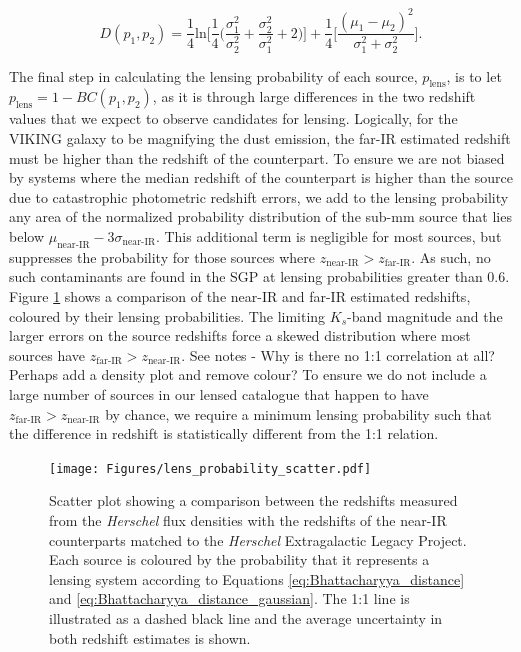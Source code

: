 \begin{equation}
    D(p_1, p_2) = \frac{1}{4}\textrm{ln}\Bigg[\frac{1}{4}\Bigg(\frac{\sigma_1^2}{\sigma_2^2}+\frac{\sigma_2^2}{\sigma_1^2}+2\Bigg)\Bigg] + \frac{1}{4}\Bigg[\frac{(\mu_1 - \mu_2)^2}{\sigma_1^2 + \sigma_2^2}\Bigg].
\label{eq:Bhattacharyya_distance_gaussian}
\end{equation}

The final step in calculating the lensing probability of each source, $p_{\textrm{lens}}$, is to let $p_{\textrm{lens}} = 1 - BC(p_1, p_2)$, as it is through large differences in the two redshift values that we expect to observe candidates for lensing. Logically, for the VIKING galaxy to be magnifying the dust emission, the far-IR estimated redshift must be higher than the redshift of the counterpart. To ensure we are not biased by systems where the median redshift of the counterpart is higher than the source due to catastrophic photometric redshift errors, we add to the lensing probability any area of the normalized probability distribution of the sub-mm source that lies below $\mu_\textrm{near-IR} - 3\sigma_\textrm{near-IR}$. This additional term is negligible for most sources, but suppresses the probability for those sources where $z_\textrm{near-IR} > z_\textrm{far-IR}$. As such, no such contaminants are found in the SGP at lensing probabilities greater than $0.6$. Figure \ref{fig:lens_probability_scatter} shows a comparison of the near-IR and far-IR estimated redshifts, coloured by their lensing probabilities. The limiting $K_s$-band magnitude and the larger errors on the source redshifts force a skewed distribution where most sources have $z_\textrm{far-IR} > z_\textrm{near-IR}$. {\color{red}See notes - Why is there no 1:1 correlation at all? Perhaps add a density plot and remove colour?} To ensure we do not include a large number of sources in our lensed catalogue that happen to have $z_\textrm{far-IR} > z_\textrm{near-IR}$ by chance, we require a minimum lensing probability such that the difference in redshift is statistically different from the 1:1 relation.

\begin{figure}
    \centering
    \texttt{[image: Figures/lens\_probability\_scatter.pdf]}
    \caption[Comparison of source and counterpart photometric redshifts]{Scatter plot showing a comparison between the redshifts measured from the \textit{Herschel} flux densities with the redshifts of the near-IR counterparts matched to the \textit{Herschel} Extragalactic Legacy Project. Each source is coloured by the probability that it represents a lensing system according to Equations \ref{eq:Bhattacharyya_distance} and \ref{eq:Bhattacharyya_distance_gaussian}. The 1:1 line is illustrated as a dashed black line and the average uncertainty in both redshift estimates is shown.}
    \label{fig:lens_probability_scatter}
\end{figure}

